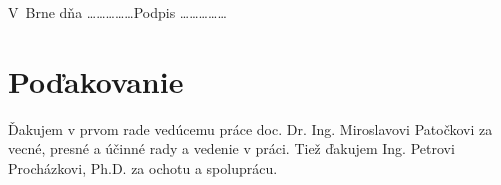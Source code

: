 \vspace{2cm}
V~Brne dňa \ldots\ldots\ldots\ldots\ldots \hspace{30mm}Podpis \ldots\ldots\ldots\ldots\ldots



\newpage\thispagestyle{empty}\mbox{}

\section*{Poďakovanie}
Ďakujem v prvom rade vedúcemu práce doc. Dr. Ing. Miroslavovi Patočkovi za vecné, presné a účinné rady a vedenie v práci. Tiež ďakujem Ing. Petrovi Procházkovi, Ph.D. za ochotu a spoluprácu.
